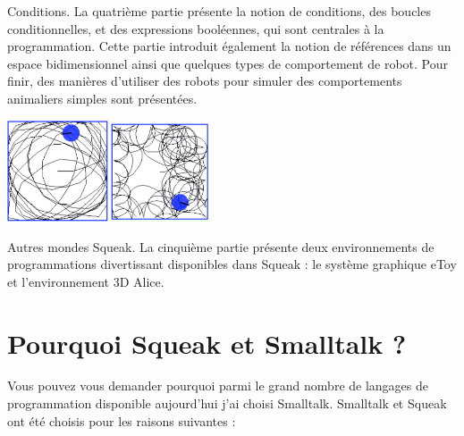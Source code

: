 \documentclass[a4paper,10pt,twoside]{book}
\begin{document}
\begin{description}
	\item Conditions. La quatri\`eme partie pr\'esente la notion de conditions, des boucles conditionnelles, et des expressions bool\'eennes, qui sont centrales \`a la programmation. Cette  partie introduit \'egalement la notion de r\'ef\'erences dans un espace bidimensionnel ainsi que quelques types de comportement de robot. Pour finir, des mani\`eres d'utiliser des robots pour simuler des comportements animaliers simples sont pr\'esent\'ees.
	
	\begin{center}
	\includegraphics[width=3cm]{4-followBorder2}\includegraphics[width=3cm]{5-oppositeBorderOfBox}
	\end{center}


\item Autres mondes Squeak. La cinqui\`eme partie pr\'esente deux environnements de programmations divertissant disponibles dans Squeak : le syst\`eme graphique eToy et l'environnement 3D Alice.

\end{description}

\section*{Pourquoi Squeak et Smalltalk ?}
Vous pouvez vous demander pourquoi parmi le grand nombre de langages de programmation disponible aujourd'hui j'ai choisi Smalltalk. Smalltalk et Squeak ont \'et\'e choisis pour les raisons suivantes :
\end{document}
